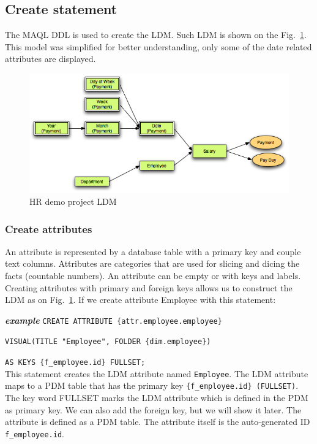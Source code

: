 \documentclass[a4paper, 12pt, titlepage, fleqn]{article}
\begin{document}
\subsection{Create statement}

The MAQL DDL is used to create the LDM. Such LDM is shown on the Fig.~\ref{fig:hrldm}. This model was simplified for better understanding, only some of the date related attributes are displayed.

\begin{figure}[htb]
\centering
\includegraphics[scale=0.6]{images/hr_simple.png}
\caption{HR demo project LDM}
\label{fig:hrldm}
\end{figure}

\subsubsection{Create attributes}
An attribute is represented by a database table with a primary key and couple text columns. Attributes are categories that are used for slicing and dicing the facts (countable numbers). An attribute can be empty or with keys and labels. Creating attributes with primary and foreign keys allows us to construct the LDM as on Fig.~\ref{fig:hrldm}. If we create attribute Employee with this statement:

\textbf{\emph{example}}  \hspace{.9cm}\verb=CREATE ATTRIBUTE {attr.employee.employee}=

\hspace{2.5cm}\verb=VISUAL(TITLE "Employee", FOLDER {dim.employee}) =

\hspace{2.5cm}\verb=AS KEYS {f_employee.id} FULLSET;=\\

\noindent This statement creates the LDM attribute named \verb=Employee=. The LDM attribute maps to a PDM table that has the primary key \verb={f_employee.id} (FULLSET)=. The key word FULLSET marks the LDM attribute which is defined in the PDM as primary key. We can also add the foreign key, but we will show it later. The attribute is defined as a PDM table. The attribute itself is the auto-generated ID \verb=f_employee.id=. 
\end{document}
